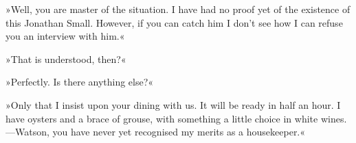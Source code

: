 »Well, you are master of the situation. I have had no proof yet of the existence of this Jonathan Small. However, if you can catch him I don't see how I can refuse you an interview with him.«

»That is understood, then?«

»Perfectly. Is there anything else?«

»Only that I insist upon your dining with us. It will be ready in half an hour. I have oysters and a brace of grouse, with something a little choice in white wines.—Watson, you have never yet recognised my merits as a housekeeper.«

